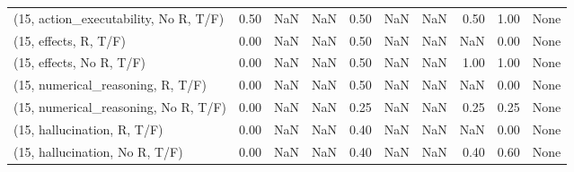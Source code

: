 \begin{table*}[h!]
\begin{adjustbox}{width=2\columnwidth,center}
\begin{tabular}{lrrr|rrr|rrr}
(15, action\_executability, No R, T/F) &                      0.50 &                   NaN &                       NaN &                          0.50 &                       NaN &                           NaN &                                   0.50 &                               1.00 &                                  None \\
(15, effects, R, T/F)                 &                      0.00 &                   NaN &                       NaN &                          0.50 &                       NaN &                           NaN &                                    NaN &                               0.00 &                                  None \\
(15, effects, No R, T/F)              &                      0.00 &                   NaN &                       NaN &                          0.50 &                       NaN &                           NaN &                                   1.00 &                               1.00 &                                  None \\
(15, numerical\_reasoning, R, T/F)     &                      0.00 &                   NaN &                       NaN &                          0.50 &                       NaN &                           NaN &                                    NaN &                               0.00 &                                  None \\
(15, numerical\_reasoning, No R, T/F)  &                      0.00 &                   NaN &                       NaN &                          0.25 &                       NaN &                           NaN &                                   0.25 &                               0.25 &                                  None \\
(15, hallucination, R, T/F)           &                      0.00 &                   NaN &                       NaN &                          0.40 &                       NaN &                           NaN &                                    NaN &                               0.00 &                                  None \\
(15, hallucination, No R, T/F)        &                      0.00 &                   NaN &                       NaN &                          0.40 &                       NaN &                           NaN &                                   0.40 &                               0.60 &                                  None \\

\end{tabular}
\end{adjustbox}
\end{table*}

